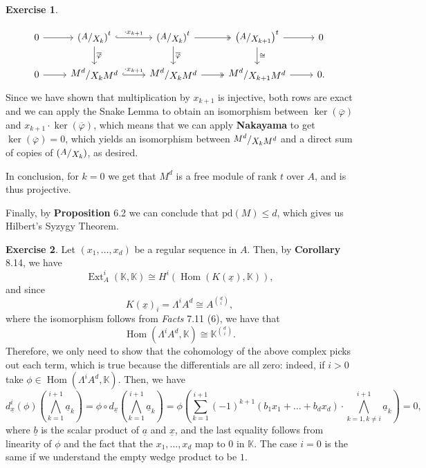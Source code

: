 \documentclass[a4paper]{article}
\newcommand{\K}{\mathbb{K}}
\newcommand{\Hom}{\operatorname{Hom}}
\newcommand{\Ext}{\operatorname{Ext}}
\newcommand{\sfrac}[2]{
    \raisebox{+0.3ex}{$#1$}
    /
    \raisebox{-0.3ex}{$#2$}
}
\newcommand{\ssfrac}[2]{
    \raisebox{+0.3ex}{\scalebox{0.9}{$#1$}}
    /
    \raisebox{-0.3ex}{\scalebox{0.9}{$#2$}}
}
\theoremstyle{definition}
\theoremstyle{definition}
\theoremstyle{remark}
\theoremstyle{definition}
\newtheorem{exercise}{Exercise}[section]
\begin{document}
\begin{exercise}
\begin{itemize}
		\begin{equation*}
			\begin{tikzcd}
				0 \rar & \left(\ssfrac{A}{X_{k}}\right)^t \rar["\cdot x_{k+1}", hook,]\ar[d, "\overline{\varphi}"]&\left(\ssfrac{A}{X_{k}}\right)^t \rar[two heads]\ar[d,"\overline{\varphi}"] & \left(\ssfrac{A}{X_{k+1}}\right)^t \rar\ar[d,"\cong"] & 0\\
			0 \rar & \sfrac{M^d}{X_k M^d} \rar["\cdot x_{k+1}", hook] & \sfrac{M^d}{X_k M^d} \rar[two heads] & \sfrac{M^d}{X_{k+1} M^d} \rar & 0.
			\end{tikzcd}
		\end{equation*}
		Since we have shown that  multiplication by $x_{k+1}$ is injective, both rows are exact and we can apply the Snake Lemma to obtain an isomorphism between
		$\ker{(\overline{\varphi})}$ and $x_{k+1}\cdot\ker{(\overline{\varphi})}$, which means that we can apply \textbf{Nakayama} to get $\ker{(\overline{\varphi})}=0$,
		which yields an isomorphism between $\ssfrac{M^d}{X_k M^d}$ and a direct sum of copies of $\left( \ssfrac{A}{X_k} \right)$, as desired.

	In conclusion, for $k=0$ we get that $M^d$ is a free module of rank $t$ over $A$, and is thus projective.

	Finally, by \textbf{Proposition} 6.2 we can conclude that $\text{pd}(M)\leq d$, which gives us Hilbert's Syzygy Theorem.
	\end{itemize}

\end{exercise}
\begin{exercise}
	Let $(x_1,\dots,x_d)$ be a regular sequence in $A$. Then, by \textbf{Corollary} 8.14, we have $$\Ext_A^i\left( \K,\K \right)\cong H^i\left( \Hom\left( K(\underline{x}),\K \right)  \right),$$
	and since $$ K(\underline{x})_i=\Lambda^i{A^d}\cong A^{\binom{d}{i}} ,$$
	where the isomorphism follows from \textit{Facts} 7.11 (6), we have that $$\Hom\left( \Lambda^i A^d,\K \right)\cong\K^{\binom{d}{i}}.$$
	Therefore, we only need to show that the cohomology of the above complex picks out each term, which is true because the differentials are all zero: indeed, if $i>0$ take
	$\phi\in\Hom\left( \Lambda^i A^d,\K \right)$. Then, we have
	$$d_{\underline{x}}^i{(\phi)}\left( \bigwedge_{k=1}^{i+1}{\underline{a}_{k}} \right) =\phi\circ
	d_{\underline{x}}{\left(\bigwedge_{k=1}^{i+1}{\underline{a}_{k}}\right)}=\phi\left( \sum_{k=1}^{i+1}{(-1)^{k+1}\left( b_1 x_1+\dots+b_d x_d \right)\cdot
	\bigwedge_{k=1,k\neq i}^{i+1}{\underline{a}_k} } \right)=0,$$
	where $\underline{b}$ is the scalar product of $\underline{a}$ and $\underline{x}$, and the last equality follows from linearity of $\phi$ and the fact that the
	$x_1,\dots,x_d$ map to 0 in $\K$. The case $i=0$ is the same if we understand the empty wedge product to be $1$.
\end{exercise}
\end{document}
